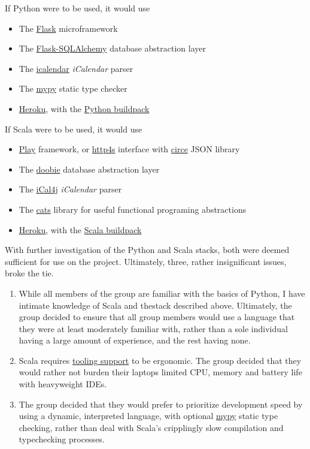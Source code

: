 \documentclass[11pt,a4paper]{report}
\begin{document}
If Python were to be used, it would use

\begin{itemize} 
    \item The \href{http://flask.pocoo.org/}{Flask} microframework
    \item The \href{http://flask-sqlalchemy.pocoo.org/2.1/}{Flask-SQLAlchemy} database abstraction layer
    \item The \href{https://pypi.python.org/pypi/icalendar}{icalendar} \textit{iCalendar} parser
    \item The \href{http://mypy-lang.org/}{mypy} static type checker
    \item \href{https://www.heroku.com/}{Heroku}, with the \href{https://github.com/heroku/heroku-buildpack-python}{Python buildpack}
\end{itemize}


If Scala were to be used, it would use

\begin{itemize}
    \item \href{https://www.playframework.com/}{Play} framework, or \href{https://github.com/http4s/http4s}{http4s} interface with \href{https://github.com/circe/circe}{circe} JSON library
    \item The \href{https://github.com/tpolecat/doobie}{doobie} database abstraction layer
    \item The \href{https://github.com/ical4j/ical4j}{iCal4j} \textit{iCalendar} parser
    \item The \href{https://github.com/typelevel/cats}{cats} library for useful functional programing abstractions
    \item \href{https://www.heroku.com/}{Heroku}, with the \href{https://github.com/heroku/heroku-buildpack-scala}{Scala buildpack}
\end{itemize}


With further investigation of the Python and Scala stacks, both were deemed sufficient for use on the project. Ultimately, three, rather insignificant issues, broke the tie.

\begin{enumerate}
    \item While all members of the group are familiar with the basics of Python, I have intimate knowledge of Scala and thestack described above. Ultimately, the group decided to ensure that all group members would use a language that they were at least moderately familiar with, rather than a sole individual having a large amount of experience, and the rest having none.
    \item Scala requires \href{https://plugins.jetbrains.com/plugin/1347-scala}{tooling support} to be ergonomic. The group decided that they would rather not burden their laptops limited CPU, memory and battery life with heavyweight IDEs.
    \item The group decided that they would prefer to prioritize development speed by using a dynamic, interpreted language, with optional \href{http://mypy-lang.org/}{mypy} static type checking, rather than deal with Scala's cripplingly slow compilation and typechecking processes.
\end{enumerate}
\end{document}
